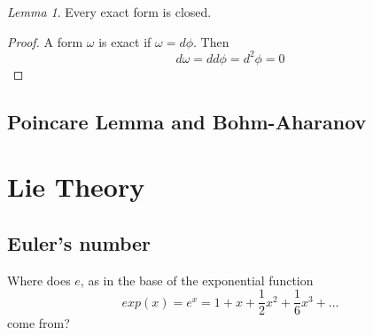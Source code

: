 \documentclass[12pt]{article}
\theoremstyle{definition}
\theoremstyle{remark}
\theoremstyle{example}
\theoremstyle{theorem}
\theoremstyle{lemma}
\newtheorem{lemma}{Lemma}
\begin{document}
\begin{lemma}
	Every exact form is closed.
	\begin{proof}
		A form $\omega$ is exact if $\omega=d\phi$. Then
		\begin{equation}
			d\omega=dd\phi=d^2\phi=0
		\end{equation}
	\end{proof}
\end{lemma}




\subsection{Poincare Lemma and Bohm-Aharanov}

\section{Lie Theory}

\subsection{Euler's number}

Where does $e$, as in the base of the exponential function
\begin{equation}
	exp(x)=e^x=1+x+\frac{1}{2}x^2+\frac{1}{6	}x^3+\dots
\end{equation}
come from?
\end{document}
